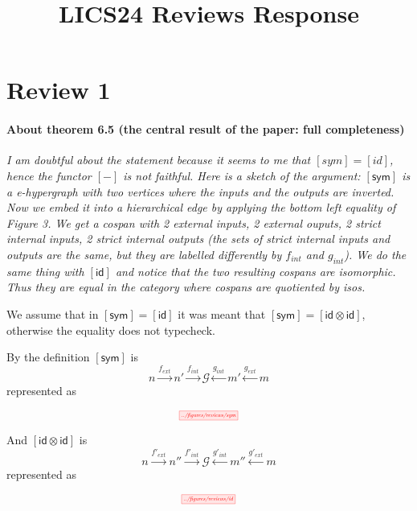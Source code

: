\documentclass{article}
\newcommand\id{\textsf{id}}
\newcommand\sym{\textsf{sym}}
\begin{document}
\title{LICS24 Reviews Response}
\author{}

\maketitle

\section*{Review 1}
\paragraph{About theorem 6.5 (the central result of the paper: full completeness)}
\textit{I am doubtful about the statement because it seems to me that $[sym] = [id]$,
hence the functor $[-]$ is not faithful.
Here is a sketch of the argument: $[\sym]$ is a e-hypergraph with two vertices
where the inputs and the outputs are inverted. Now we embed it into a
hierarchical edge by applying the bottom left equality of Figure 3.
We get a cospan with 2 external inputs, 2 external ouputs, 2 strict internal
inputs, 2 strict internal outputs (the sets of strict internal inputs and
outputs are the same, but they are labelled differently by $f_{int}$ and $g_{int}$). We
do the same thing with $[\id]$ and notice that the two resulting cospans are
isomorphic. Thus they are equal in the category where cospans are quotiented by
isos.}

We assume that in $[\sym] = [\id]$ it was meant that $[\sym] = [\id \otimes \id]$, otherwise the equality does not typecheck.

By the definition $[\sym]$ is 
\[
    n \xrightarrow{f_{ext}} n' \xrightarrow{f_{int}} \mathcal{G} \xleftarrow{g_{int}} m' \xleftarrow{g_{ext}} m
\]
represented as
\begin{figure}[h!]
    \[
    \scalebox{0.5}{
        \tikzfig{../figures/reviews/sym}
    }
    \]
\end{figure}

And $[\id \otimes \id]$ is \[
    n \xrightarrow{f'_{ext}} n'' \xrightarrow{f'_{int}} \mathcal{G} \xleftarrow{g'_{int}} m'' \xleftarrow{g'_{ext}} m
\]
represented as 
\begin{figure}[h!]
    \[
    \scalebox{0.5}{
        \tikzfig{../figures/reviews/id}
    }
    \]
\end{figure}
\end{document}
